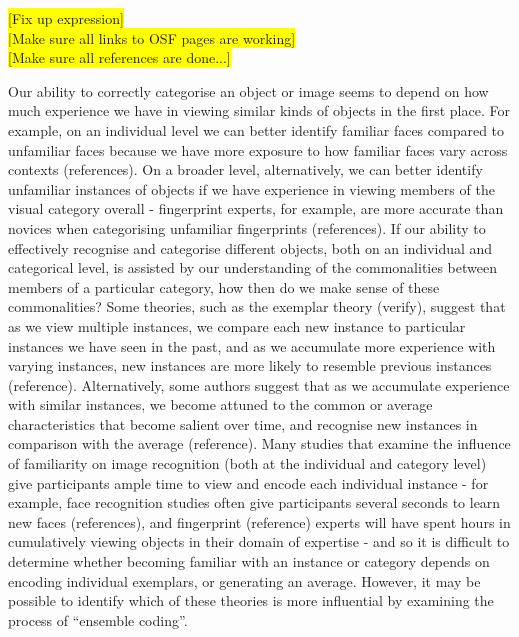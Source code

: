 \documentclass[
  english,
  man]{apa6}
\begin{document}
\colorbox{yellow}{[Fix up expression]}\\
\colorbox{yellow}{[Make sure all links to OSF pages are working]}\\
\colorbox{yellow}{[Make sure all references are done...]}

Our ability to correctly categorise an object or image seems to depend on how much experience we have in viewing similar kinds of objects in the first place. For example, on an individual level we can better identify familiar faces compared to unfamiliar faces because we have more exposure to how familiar faces vary across contexts (references). On a broader level, alternatively, we can better identify unfamiliar instances of objects if we have experience in viewing members of the visual category overall - fingerprint experts, for example, are more accurate than novices when categorising unfamiliar fingerprints (references). If our ability to effectively recognise and categorise different objects, both on an individual and categorical level, is assisted by our understanding of the commonalities between members of a particular category, how then do we make sense of these commonalities? Some theories, such as the exemplar theory (verify), suggest that as we view multiple instances, we compare each new instance to particular instances we have seen in the past, and as we accumulate more experience with varying instances, new instances are more likely to resemble previous instances (reference). Alternatively, some authors suggest that as we accumulate experience with similar instances, we become attuned to the common or average characteristics that become salient over time, and recognise new instances in comparison with the average (reference). Many studies that examine the influence of familiarity on image recognition (both at the individual and category level) give participants ample time to view and encode each individual instance - for example, face recognition studies often give participants several seconds to learn new faces (references), and fingerprint (reference) experts will have spent hours in cumulatively viewing objects in their domain of expertise - and so it is difficult to determine whether becoming familiar with an instance or category depends on encoding individual exemplars, or generating an average. However, it may be possible to identify which of these theories is more influential by examining the process of ``ensemble coding''.
\end{document}
